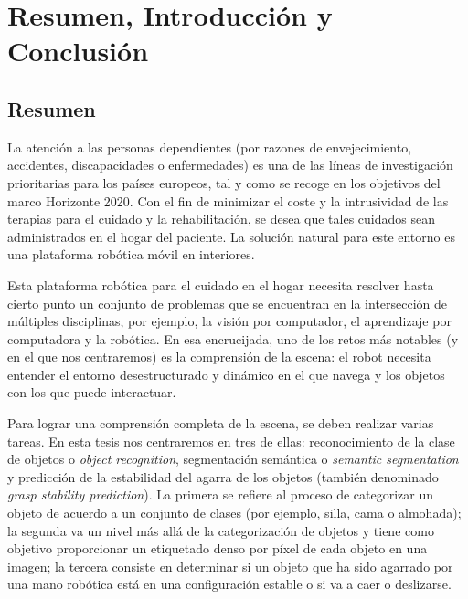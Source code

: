 \chapter{Resumen, Introducción y Conclusión}
\label{cha:conclusion_sp}

\section{Resumen}

La atención a las personas dependientes (por razones de envejecimiento, accidentes, discapacidades o enfermedades) es una de las líneas de investigación prioritarias para los países europeos, tal y como se recoge en los objetivos del marco Horizonte 2020. Con el fin de minimizar el coste y la intrusividad de las terapias para el cuidado y la rehabilitación, se desea que tales cuidados sean administrados en el hogar del paciente. La solución natural para este entorno es una plataforma robótica móvil en interiores.

Esta plataforma robótica para el cuidado en el hogar necesita resolver hasta cierto punto un conjunto de problemas que se encuentran en la intersección de múltiples disciplinas, por ejemplo, la visión por computador, el aprendizaje por computadora y la robótica. En esa encrucijada, uno de los retos más notables (y en el que nos centraremos) es la comprensión de la escena: el robot necesita entender el entorno desestructurado y dinámico en el que navega y los objetos con los que puede interactuar.

Para lograr una comprensión completa de la escena, se deben realizar varias tareas. En esta tesis nos centraremos en tres de ellas: reconocimiento de la clase de objetos o \emph{object recognition}, segmentación semántica o \emph{semantic segmentation} y predicción de la estabilidad del agarra de los objetos (también denominado \emph{grasp stability prediction}). La primera se refiere al proceso de categorizar un objeto de acuerdo a un conjunto de clases (por ejemplo, silla, cama o almohada); la segunda va un nivel más allá de la categorización de objetos y tiene como objetivo proporcionar un etiquetado denso por píxel de cada objeto en una imagen; la tercera consiste en determinar si un objeto que ha sido agarrado por una mano robótica está en una configuración estable o si va a caer o deslizarse.

